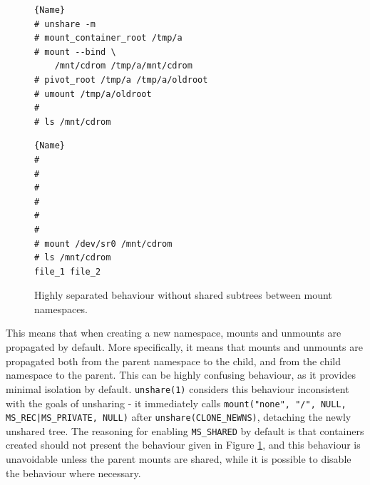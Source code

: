 \documentclass[a4paper,12pt,twoside,openright]{report}
\begin{document}
\begin{figure}
\begin{minipage}{.45\textwidth}

\begin{lstlisting}[frame=tlrb,showlines=true]{Name}
# unshare -m
# mount_container_root /tmp/a
# mount --bind \
    /mnt/cdrom /tmp/a/mnt/cdrom
# pivot_root /tmp/a /tmp/a/oldroot
# umount /tmp/a/oldroot
#
# ls /mnt/cdrom

\end{lstlisting}

\end{minipage}\hfill
\begin{minipage}{.45\textwidth}

\begin{lstlisting}[frame=tlrb]{Name}
#
#
#
#
#
#
# mount /dev/sr0 /mnt/cdrom
# ls /mnt/cdrom
file_1 file_2
\end{lstlisting}

\end{minipage}

\caption{Highly separated behaviour without shared subtrees between mount namespaces.}
\label{fig:shared-subtrees}
\end{figure}


This means that when creating a new namespace, mounts and unmounts are propagated by default. More specifically, it means that mounts and unmounts are propagated both from the parent namespace to the child, and from the child namespace to the parent. This can be highly confusing behaviour, as it provides minimal isolation by default. \texttt{unshare(1)} considers this behaviour inconsistent with the goals of unsharing - it immediately calls \texttt{mount("none", "/", NULL, MS\_REC|MS\_PRIVATE, NULL)} after \texttt{unshare(CLONE\_NEWNS)}, detaching the newly unshared tree. The reasoning for enabling \texttt{MS\_SHARED} by default is that containers created should not present the behaviour given in Figure \ref{fig:shared-subtrees}, and this behaviour is unavoidable unless the parent mounts are shared, while it is possible to disable the behaviour where necessary.
\end{document}
